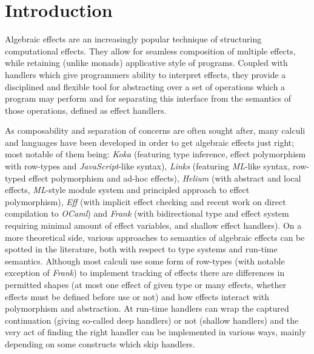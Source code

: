 \documentclass[inz, english, shortabstract]{iithesis}
\author         {Maciej Buszka}
\begin{document}
%
\chapter{Introduction}
% 
%
%
%
Algebraic effects \cite{Plotkin2003} are an increasingly popular technique of structuring computational effects.
They allow for seamless composition of multiple effects, while retaining (unlike monads) applicative style of programs.
Coupled with handlers \cite{Plotkin2013} which give programmers ability to interpret effects, they provide a disciplined and flexible tool for abstracting over a set of operations which a program may perform and for separating this interface from the semantics of those operations, defined as effect handlers.

As composability and separation of concerns are often sought after, many calculi and languages have been developed in order to get algebraic effects just right; most notable of them being: \emph{Koka}\cite{Leijen2014} (featuring type inference, effect polymorphism with row-types and \emph{JavaScript}-like syntax), \emph{Links}\cite{Hillerstrom2016} (featuring \emph{ML}-like syntax, row-typed effect polymorphism and ad-hoc effects), \emph{Helium}\cite{Biernacki2019} (with abstract and local effects, \emph{ML}-style module system and principled approach to effect polymorphism), \emph{Eff}\cite{Bauer2012} (with implicit effect checking and recent work on direct compilation to \emph{OCaml}\cite{Kiselyov2018}) and \emph{Frank}\cite{Lindley2017} (with bidirectional type and effect system requiring minimal amount of effect variables, and shallow effect handlers). 
On a more theoretical side, various approaches to semantics of algebraic effects can be spotted in the literature, both with respect to type systems and run-time semantics.
Although most calculi use some form of row-types (with notable exception of \emph{Frank}\cite{Lindley2017}) to implement tracking of effects there are differences in permitted shapes (at most one effect\cite{Hillerstrom2016} of given type or many effects\cite{Biernacki2017,Leijen2014}, whether effects must be defined before use\cite{Biernacki2017,Lindley2017,Leijen2014,Bauer2012} or not\cite{Hillerstrom2016}) and how effects interact with polymorphism and abstraction.
At run-time handlers can wrap the captured continuation (giving so-called deep handlers\cite{Biernacki2017,Hillerstrom2016,Leijen2014,Bauer2012}) or not (shallow handlers\cite{Lindley2017}) and the very act of finding the right handler can be implemented in various ways, mainly depending on some constructs which skip handlers\cite{Biernacki2017}.
\end{document}
